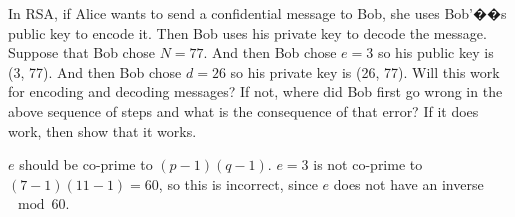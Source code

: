 \question In RSA, if Alice wants to send a confidential message to Bob, 
she uses Bob'��s public key to encode it. Then Bob uses his private key 
to decode the message. Suppose that Bob chose $N = 77$. And then Bob 
chose $e = 3$ so his public key is (3, 77). And then Bob chose $d = 26$ 
so his private key is (26, 77). \newline
Will this work for encoding and decoding messages? If not, where did 
Bob first go wrong in the above sequence of steps and what is the 
consequence of that error? If it does work, then show that it works.

\begin{solution}[2 in]
$e$ should be co-prime to $(p - 1)(q - 1)$.\newline
$e = 3$ is not co-prime to $(7 - 1)(11 - 1) = 60$, so this is incorrect, 
since $e$ does not have an inverse $\mod 60$. 
\end{solution}